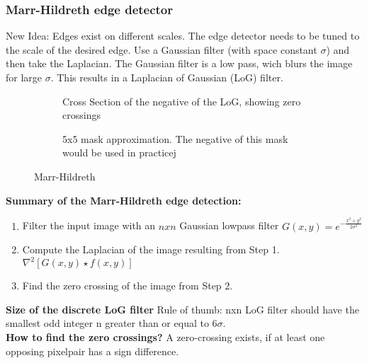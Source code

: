 \subsubsection{Marr-Hildreth edge detector}
New Idea: Edges exist on different scales. The edge detector needs to be tuned to the scale of the desired edge. Use a Gaussian filter (with space constant $\sigma$) and then take the Laplacian. The Gaussian filter is a low pass, wich blurs the image for large $\sigma$. This results in a Laplacian of Gaussian (LoG) filter.
\begin{figure}[h]
	\centering
	\begin{subfigure}[b]{0.45\textwidth}
		\centering
		\caption{Cross Section of the negative of the LoG, showing zero crossings}
	\end{subfigure}
	\begin{subfigure}[b]{0.45\textwidth}
		\centering
		\caption{5x5 mask approximation. The negative of this mask would be used in practicej}
	\end{subfigure}
	\caption{Marr-Hildreth}
\end{figure}

\textbf{Summary of the Marr-Hildreth edge detection:}
\begin{enumerate}
\item Filter the input image with an $n x n$ Gaussian lowpass filter $G(x,y)=e^{-\frac{x^2+y^2}{2\sigma^2}}$
\item Compute the Laplacian of the image resulting from Step 1. $\nabla ^2[G(x,y) \star f(x,y)]$
\item Find the zero crossing of the image from Step 2.
\end{enumerate}
\textbf{Size of the discrete LoG filter}
Rule of thumb: nxn LoG filter should have the smallest odd integer n greater than or equal to $6\sigma$.\\
\textbf{How to find the zero crossings?}
A zero-crossing exists, if at least one opposing pixelpair has a sign difference.

